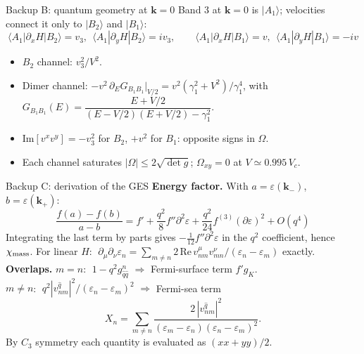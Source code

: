 \documentclass[aspectratio=169,11pt]{beamer}
\newcommand{\bk}{\mathbf{k}}
\newcommand{\chim}{\chi_{\rm mass}}
\begin{document}
\begin{frame}{Backup B: quantum geometry at $\bk=0$}
Band 3 at $\bk=0$ is $|A_1\rangle$; velocities connect it only to $|B_2\rangle$ and $|B_1\rangle$:
\[
\langle A_1|\partial_xH|B_2\rangle=v_3,\ \ \langle A_1|\partial_yH|B_2\rangle=iv_3,\qquad
\langle A_1|\partial_xH|B_1\rangle=v,\ \ \langle A_1|\partial_yH|B_1\rangle=-iv
\]
\begin{itemize}\small\setlength{\itemsep}{4pt}
\item $B_2$ channel: $v_3^2/V^2$.
\item Dimer channel: $-v^2\,\partial_EG_{B_1B_1}\big|_{V/2}=v^2(\gamma_1^2+V^2)/\gamma_1^4$, with
      $G_{B_1B_1}(E)=\dfrac{E+V/2}{(E-V/2)(E+V/2)-\gamma_1^2}$.
\item $\mathrm{Im}[v^xv^y]=-v_3^2$ for $B_2$, $+v^2$ for $B_1$: opposite signs in $\Omega$.
\item Each channel saturates $|\Omega|\le2\sqrt{\det g}$; $\Omega_{xy}=0$ at $V\simeq0.995\,V_c$.
\end{itemize}
\end{frame}

\begin{frame}{Backup C: derivation of the GES}
\footnotesize
\textbf{Energy factor.} With $a=\varepsilon(\bk_-)$, $b=\varepsilon(\bk_+)$:
\[
\frac{f(a)-f(b)}{a-b}=f'+\frac{q^2}{8}f''\partial^2\varepsilon+\frac{q^2}{24}f^{(3)}(\partial\varepsilon)^2+O(q^4)
\]
Integrating the last term by parts gives $-\tfrac1{12}f''\partial^2\varepsilon$ in the $q^2$ coefficient, hence $\chim$.
For linear $H$: $\;\partial_\mu\partial_\nu\varepsilon_n=\sum_{m\ne n}2\,\mathrm{Re}\,v^\mu_{nm}v^\nu_{mn}/(\varepsilon_n-\varepsilon_m)$ exactly.\\[6pt]
\textbf{Overlaps.} $m=n$: $\;1-q^2g^n_{\hat q\hat q}$ $\Rightarrow$ Fermi-surface term $f'g_K$.\\
$m\neq n$: $\;q^2|v^{\hat q}_{nm}|^2/(\varepsilon_n-\varepsilon_m)^2$ $\Rightarrow$ Fermi-sea term
\[
X_n=\sum_{m\neq n}\frac{2\,|v^{\hat q}_{nm}|^2}{(\varepsilon_m-\varepsilon_n)(\varepsilon_n-\varepsilon_m)^2}.
\]
By $C_3$ symmetry each quantity is evaluated as $(xx+yy)/2$.
\end{frame}
\end{document}
